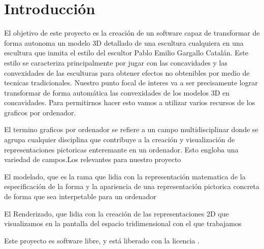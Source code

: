 \chapter{Introducción}

El objetivo de este proyecto es la creación de un software capaz de transformar de forma autonoma un modelo 3D detallado de una escultura cualquiera en una escultura que inmita el estilo del escultor Pablo Emilio Gargallo Catalán.
Este estilo se caracteriza principalmente por jugar con las concavidades y las convexidades de las esculturas para obtener efectos no obtenibles por medio de tecnicas tradicionales. Nuestro punto focal de interes va a ser precisamente
lograr transformar de forma automática las convexidades de los modelos 3D en concavidades. Para permitirnos hacer esto vamos a utilizar varios recursos de los graficos por ordenador.

El termino graficos por ordenador se refiere a un campo multidisciplinar donde se agrupa cualquier disciplina que contribuye a la creación y visualización de representaciones pictoricas enteremante en un ordenador.
Esto engloba una variedad de campos.Los relevantes para nuestro proyecto 
\begin{list}{.}{}
    \item El modelado, que es la rama que lidia con la representación matematica de la especificación de la forma y la apariencia de una representación pictorica concreta de forma que sea interpetable para un ordenador
    \item El Renderizado, que lidia con la creación de las representaciones 2D que visualizamos en la pantalla del espacio tridimensional con el que trabajamos
\end{list} \cite{marschner_fundamentals_2018}


Este proyecto es software libre, y está liberado con la licencia \cite{gplv3}.